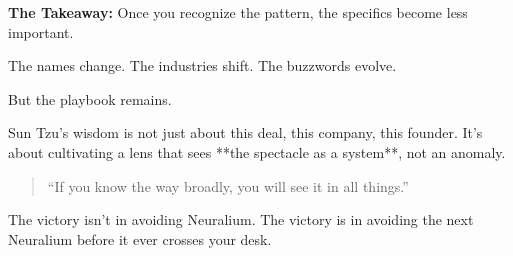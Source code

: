 \medskip

\textbf{The Takeaway:}  
Once you recognize the pattern, the specifics become less important.

The names change. The industries shift. The buzzwords evolve.

But the playbook remains.

Sun Tzu’s wisdom is not just about this deal, this company, this founder.  
It’s about cultivating a lens that sees **the spectacle as a system**, not an anomaly.

\begin{quote}
  “If you know the way broadly, you will see it in all things.”
\end{quote}

The victory isn’t in avoiding Neuralium.  
The victory is in avoiding the next Neuralium before it ever crosses your desk.

